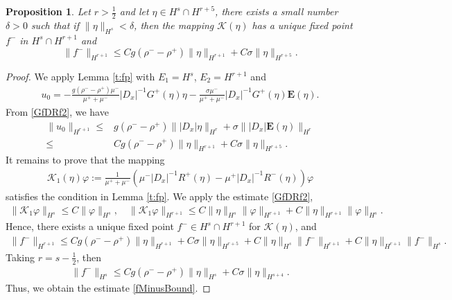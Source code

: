 \documentclass[12pt]{amsart}
\newtheorem{proposition}[theorem]{Proposition}
\theoremstyle{definition}
\numberwithin{equation}{section}
\newcommand{\f}{\frac}
\begin{document}
\begin{proposition}\label{Prop:f-}
Let $r>\f12$ and let $\eta\in H^s\cap H^{r+5}$, there exists a small number $\delta>0$ such that if  $\| \eta\|_{H^s}<\delta$, then the mapping $\mathcal{K}(\eta)$ has a unique fixed point $f^-$ in $H^s\cap H^{r+1}$ and
\begin{equation} \label{fMinusBound}
\|f^{-}\|_{H^{r+1}}\leq Cg(\rho^--\rho^+)\|\eta\|_{H^{r+1}}
+C\sigma\|\eta\|_{H^{r+5}}.
\end{equation}
\end{proposition}
\begin{proof}
We apply Lemma \ref{t:fp} with $E_1=H^s$, $E_2=H^{r+1}$ and 
\begin{align*}
u_0=-\f{g(\rho^- - \rho^+)\mu^-}{\mu^+ + \mu^-}|D_x|^{-1}G^+ (\eta) \eta -\f{\sigma \mu^-}{\mu^+ + \mu^-}|D_x|^{-1}G^+ (\eta) \mathbf{E}(\eta).
\end{align*}
From \eqref{GfDRf2}, we have
\begin{align*}
\|u_0\|_{H^{r+1}}\leq&g(\rho^--\rho^+)\||D_x|\eta\|_{H^{r}}
+\sigma\||D_x|\mathbf{E}(\eta)\|_{H^{r}}\\
\leq&Cg(\rho^--\rho^+)\|\eta\|_{H^{r+1}}
+C\sigma\|\eta\|_{H^{r+5}}.
\end{align*}
It remains to prove that the mapping
\begin{align*}
\mathcal{K}_1(\eta)\varphi := \f{1}{\mu^+ + \mu^-}(\mu^- |D_x|^{-1}R^+(\eta)-\mu^+ |D_x|^{-1}R^-(\eta))\varphi
\end{align*}
satisfies the condition in Lemma \ref{t:fp}. 
We apply the estimate \eqref{GfDRf2},
\begin{align*}
\|\mathcal{K}_1\varphi\|_{H^{s}}\leq C\|\varphi\|_{H^{s}},\quad
\|\mathcal{K}_1\varphi\|_{H^{r+1}}\leq C\|\eta\|_{H^s}\|\varphi\|_{H^{r+1}}+C\|\eta\|_{H^{r+1}}\|\varphi\|_{H^s}.
\end{align*}
Hence, there exists a unique fixed point $f^-\in H^s\cap H^{r+1}$ for $\mathcal{K}(\eta)$, and
\begin{align*}
\|f^-\|_{H^{r+1}}\leq Cg(\rho^--\rho^+)\|\eta\|_{H^{r+1}}
+C\sigma\|\eta\|_{H^{r+5}}+C\|\eta\|_{H^s}\|f^-\|_{H^{r+1}}+C\|\eta\|_{H^{r+1}}\|f^-\|_{H^s}.
\end{align*}
Taking $r=s-\f12$, then
\begin{align*}
\|f^-\|_{H^s}\leq Cg(\rho^--\rho^+)\|\eta\|_{H^s}
+C\sigma\|\eta\|_{H^{s+4}}.
\end{align*}
Thus, we obtain the estimate \eqref{fMinusBound}.
\end{proof}
\end{document}
